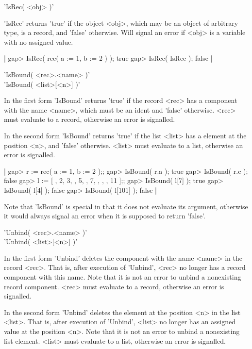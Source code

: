 'IsRec( <obj> )'

'IsRec' returns 'true'  if the object <obj>,  which  may be an object  of
arbitrary type, is a record, and 'false' otherwise.  Will signal an error
if <obj> is a variable with no assigned value.

|    gap> IsRec( rec( a := 1, b := 2 ) );
    true
    gap> IsRec( IsRec );
    false |

%
%

'IsBound( <rec>.<name> )' \\
'IsBound( <list>[<n>] )'

In the first form  'IsBound'  returns 'true'  if the  record <rec> has  a
component with the   name <name>, which  must   be an ident  and  'false'
otherwise.    <rec>  must evaluate  to a   record, otherwise  an error is
signalled.

In  the second form  'IsBound'  returns 'true'  if the  list <list> has a
element at the position <n>, and 'false' otherwise.  <list> must evaluate
to a list, otherwise an error is signalled.

|    gap> r := rec( a := 1, b := 2 );;
    gap> IsBound( r.a );
    true
    gap> IsBound( r.c );
    false
    gap> l := [  , 2, 3,  , 5,  , 7,  ,  ,   , 11 ];;
    gap> IsBound( l[7] );
    true
    gap> IsBound( l[4] );
    false
    gap> IsBound( l[101] );
    false |

Note that 'IsBound' is special in that it does not evaluate its argument,
otherwise it would  always signal an error when  it is supposed to return
'false'.

%

'Unbind( <rec>.<name> )' \\
'Unbind( <list>[<n>] )'

In the first form 'Unbind' deletes the  component with the name <name> in
the record <rec>.  That is, after  execution of 'Unbind', <rec> no longer
has a record component  with this name.  Note that  it is not an error to
unbind a nonexisting record component.  <rec> must  evaluate to a record,
otherwise an error is signalled.

In the second form  'Unbind' deletes the element  at the position <n>  in
the list <list>.  That is, after execution of  'Unbind', <list> no longer
has an assigned value at the position <n>.  Note that it  is not an error
to unbind a  nonexisting list element.  <list>  must evaluate  to a list,
otherwise an error is signalled.

